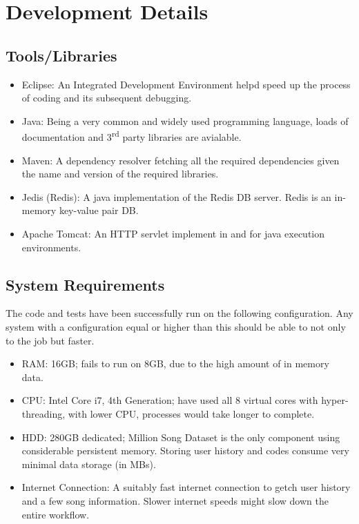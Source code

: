 \chapter{Development Details}
	\section{Tools/Libraries}
\begin{itemize}
	\item Eclipse: An Integrated Development Environment helpd speed up the process of coding and its subsequent debugging.
	\item Java: Being a very common and widely used programming language, loads of  documentation and 3\textsuperscript{rd} party libraries are avialable.
	\item Maven: A dependency resolver fetching all the required dependencies given the name and version of the required libraries.
	\item Jedis (Redis): A java implementation of the Redis DB server. Redis is an in-memory key-value pair DB.
	\item Apache Tomcat: An HTTP servlet implement in and for java execution environments.
\end{itemize}

	\section{System Requirements}
		The code and tests have been successfully run on the following configuration. Any system with a configuration equal or higher than this should be able to not only to the job but faster.
\begin{itemize}
	\item RAM: 16GB; fails to run on 8GB, due to the high amount of in memory data.
	\item CPU: Intel Core i7, 4th Generation; have used all 8 virtual cores with hyper-threading, with lower CPU, processes would take longer to complete.
	\item HDD: 280GB dedicated; Million Song Dataset is the only component using considerable persistent memory. Storing user history and codes consume very minimal data storage (in MBs).
	\item Internet Connection: A suitably fast internet connection to getch user history and a few song information. Slower internet speeds might slow down the entire workflow.
\end{itemize}

